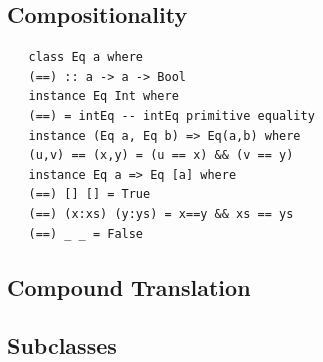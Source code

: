 \subsection{Compositionality}
\begin{lstlisting}
   class Eq a where
   (==) :: a -> a -> Bool
   instance Eq Int where
   (==) = intEq -- intEq primitive equality
   instance (Eq a, Eq b) => Eq(a,b) where
   (u,v) == (x,y) = (u == x) && (v == y)
   instance Eq a => Eq [a] where
   (==) [] [] = True
   (==) (x:xs) (y:ys) = x==y && xs == ys
   (==) _ _ = False
\end{lstlisting}

\subsection{Compound Translation}
\newpage
\subsection{Subclasses}
